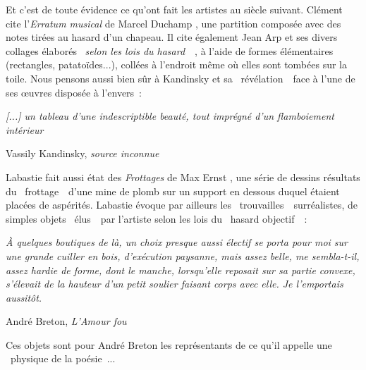 \documentclass{article}
\newenvironment{citationbox}
{\begin{center}
		\begin{minipage}{.8\textwidth}
		}
		{
		\end{minipage}	
\end{center}
}
\begin{document}
			Et c'est de toute évidence ce qu'ont fait les artistes au siècle suivant. Clément cite l'\textit{Erratum musical} de Marcel Duchamp \autocite{duchamp1915}, une partition composée avec des notes tirées au hasard d'un chapeau. Il cite également Jean Arp et ses divers collages élaborés \guillemotleft~\textit{selon les lois du hasard}~\guillemotright~\autocite{arp1916}, à l'aide de formes élémentaires (rectangles, patatoïdes...), collées à l'endroit même où elles sont tombées sur la toile. Nous pensons aussi bien sûr à Kandinsky et sa \guillemotleft~révélation~\guillemotright~face à l'une de ses œuvres disposée à l'envers~:
			\begin{citationbox}
				\textit{[...] un tableau d'une indescriptible beauté, tout imprégné d'un flamboiement intérieur}
				\begin{flushright}
					Vassily Kandinsky, \textit{source inconnue}
				\end{flushright}
			\end{citationbox}
			Labastie fait aussi état des \textit{Frottages} de Max Ernst \autocite{ernst1926}, une série de dessins résultats du \guillemotleft~frottage~\guillemotright~d'une mine de plomb sur un support en dessous duquel étaient placées de aspérités. Labastie évoque par ailleurs les \guillemotleft~trouvailles~\guillemotright~surréalistes, de simples objets \guillemotleft~élus~\guillemotright~par l'artiste selon les lois du \guillemotleft~hasard objectif~\guillemotright~:
			\begin{citationbox}
				\textit{À quelques boutiques de là, un choix presque aussi électif se porta pour moi sur une grande cuiller en bois, d'exécution paysanne, mais assez belle, me sembla-t-il, assez hardie de forme, dont le manche, lorsqu'elle reposait sur sa partie convexe, s'élevait de la hauteur d'un petit soulier faisant corps avec elle. Je l'emportais aussitôt.}\\
				\begin{flushright}
					André Breton, \textit{L'Amour fou}\autocite{breton1937}
				\end{flushright}
			\end{citationbox}
			Ces objets sont pour André Breton les représentants de ce qu'il appelle une \guillemotleft~physique de la poésie~\guillemotright...\\
			
\end{document}
